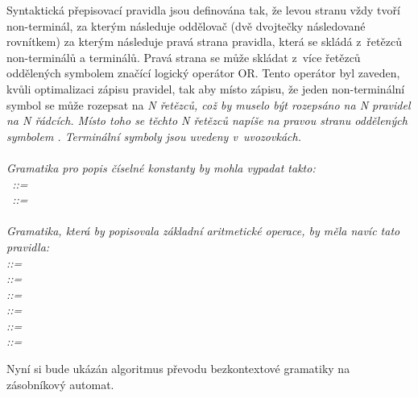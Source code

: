 Syntaktická přepisovací pravidla jsou definována tak, že levou stranu vždy tvoří non-terminál, za kterým následuje oddělovač \uv{::=} (dvě dvojtečky následované rovnítkem) za kterým následuje pravá strana pravidla, která se skládá z~řetězců non-terminálů a terminálů. Pravá strana se může skládat z~více řetězců oddělených symbolem \uv{\textbar} značící logický operátor OR. Tento operátor byl zaveden, kvůli optimalizaci zápisu pravidel, tak aby místo zápisu, že jeden non-terminální symbol se může rozepsat na \it{N} řetězců, což by muselo být rozepsáno na \it{N} pravidel na \it{N} řádcích. Místo toho se těchto \it{N} řetězců napíše na pravou stranu oddělených symbolem \uv{\textbar}. Terminální symboly jsou uvedeny v~uvozovkách.
\cite{BCF}
\\
\\
Gramatika pro popis číselné konstanty by mohla vypadat takto:\\
~::= ~\textbar~  \\
~::=~~\textbar~~\textbar~~\textbar~~\textbar~~
\textbar~~\textbar~~\textbar~~\textbar~~\textbar~ \\
\\
Gramatika, která by popisovala základní aritmetické operace, by měla navíc tato pravidla:\\
 ::=  \uv{+}  \\
 ::=  \uv{-}  \\
 ::=  \uv{\(\times\)}  \\
 ::=  \uv{/}  \\
 ::= \uv{(}  \uv{)} \\
 ::= \\


Nyní si bude ukázán algoritmus převodu bezkontextové gramatiky na zásobníkový automat. \cite{CFG_to_PDA}

